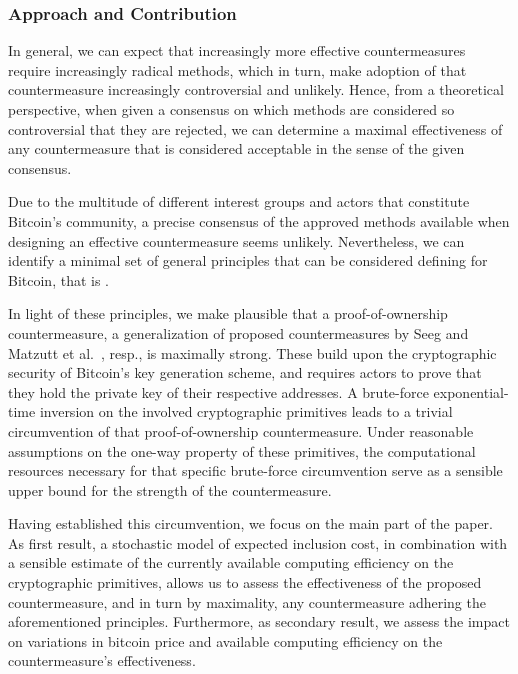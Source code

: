 \documentclass[a4paper,11pt,titlepage]{scrbook}
\begin{document}
\subsubsection*{Approach and Contribution}

In general, we can expect that increasingly more effective countermeasures require increasingly radical methods, which in turn, make adoption of that countermeasure increasingly controversial and unlikely.
Hence, from a theoretical perspective, when given a consensus on which methods are considered so controversial that they are rejected, we can determine a maximal effectiveness of any countermeasure that is considered acceptable in the sense of the given consensus.

Due to the multitude of different interest groups and actors that constitute Bitcoin's community, a precise consensus of the approved methods available when designing an effective countermeasure seems unlikely.
Nevertheless, we can identify a minimal set of general principles that can be considered defining for Bitcoin,
that is .

In light of these principles, we make plausible that a proof-of-ownership countermeasure, a generalization of proposed countermeasures by Seeg \cite{seeg_hardening_2018} and Matzutt et al.~\cite{matzutt_thwarting_2018}, resp., is maximally strong. 
These build upon the cryptographic security of Bitcoin's key generation scheme, and requires actors to prove that they hold the private key of their respective addresses.
A brute-force exponential-time inversion on the involved cryptographic primitives leads to a trivial circumvention of that proof-of-ownership countermeasure.
Under reasonable assumptions on the one-way property of these primitives,
the computational resources necessary for that specific brute-force circumvention serve as a sensible upper bound for the strength of the countermeasure.

Having established this circumvention, we focus on the main part of the paper.
As first result, a stochastic model of expected inclusion cost, in combination with a sensible estimate of the currently available computing efficiency on the cryptographic primitives, allows us to assess the effectiveness of the proposed countermeasure, and in turn by maximality, any countermeasure adhering the aforementioned principles.
Furthermore, as secondary result, we assess the impact on variations in bitcoin price and available computing efficiency on the countermeasure's effectiveness.
\end{document}
